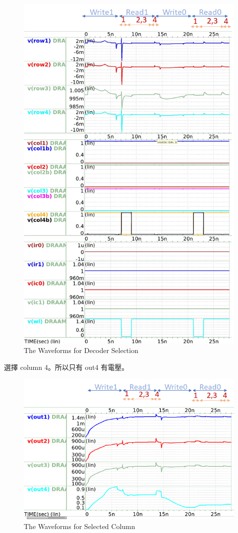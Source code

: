 \documentclass{article}
\begin{document}
\begin{enumerate}
    \begin{figure}[H]
      \centering
      \includegraphics[width = 0.78\linewidth]{./img/2023-12-24-17-23-56.png}
      \caption{The Waveforms for Decoder Selection}
      \end{figure}
  

      \clearpage

  選擇 column 4。所以只有 out4 有電壓。

  \begin{figure}[H]
    \centering
    \includegraphics[width = \linewidth]{./img/2023-12-24-17-21-08.png}
    \caption{The Waveforms for Selected Column}
    \end{figure}
  

\end{enumerate}
\end{document}
